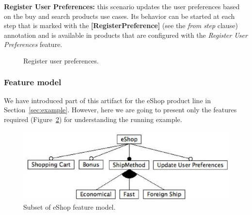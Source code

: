 \documentclass{acm_proc_article-sp}
\begin{document}
{\bf Register User Preferences:} this scenario updates the user preferences based on the buy and search products use cases. Its behavior can be 
started at each step that is marked with the {\bf [RegisterPreference]} (see the \emph{from step} clause) annotation and is available in products 
that are configured with the \emph{Register User Preferences} feature.

\begin{figure}[h]
\caption{Register user preferences.}
\label{fig:register-preferences-flow}
\end{figure}

\subsubsection{Feature model}

We have introduced part of this artifact for the eShop product line in Section~\ref{sec:example}. However, here we are going to 
present only the features required  (Figure~\ref{fig:eshop-fm-re}) for understanding the running example. 

 \begin{figure}[h]
 \begin{center}
  \includegraphics[scale=0.40]{img/eShop-fm-re.eps}
   \caption{Subset of eShop feature model.}
  \label{fig:eshop-fm-re}
  \end{center}
\end{figure}
\end{document}
